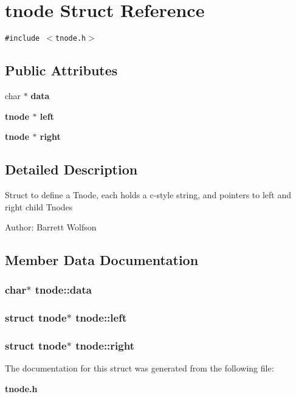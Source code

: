 \section{tnode Struct Reference}
\label{structtnode}
{\tt \#include $<$tnode.h$>$}

\subsection*{Public Attributes}
\begin{CompactItemize}
\item 
char $\ast$ \bf{data}
\item 
\bf{tnode} $\ast$ \bf{left}
\item 
\bf{tnode} $\ast$ \bf{right}
\end{CompactItemize}


\subsection{Detailed Description}
Struct to define a Tnode, each holds a c-style string, and pointers to left and right child Tnodes \begin{Desc}
\item[Author:]Barrett Wolfson \end{Desc}




\subsection{Member Data Documentation}
\subsubsection{\setlength{\rightskip}{0pt plus 5cm}char$\ast$ \bf{tnode::data}}\label{structtnode_5ada5650cb8d96f549dddde5dfda499d}


\subsubsection{\setlength{\rightskip}{0pt plus 5cm}struct \bf{tnode}$\ast$ \bf{tnode::left}}\label{structtnode_0f384e767c2845a1090beedb9c3d7b1b}


\subsubsection{\setlength{\rightskip}{0pt plus 5cm}struct \bf{tnode}$\ast$ \bf{tnode::right}}\label{structtnode_2763d6cf8d35b9fae125181291f63aca}




The documentation for this struct was generated from the following file:\begin{CompactItemize}
\item 
\bf{tnode.h}\end{CompactItemize}
